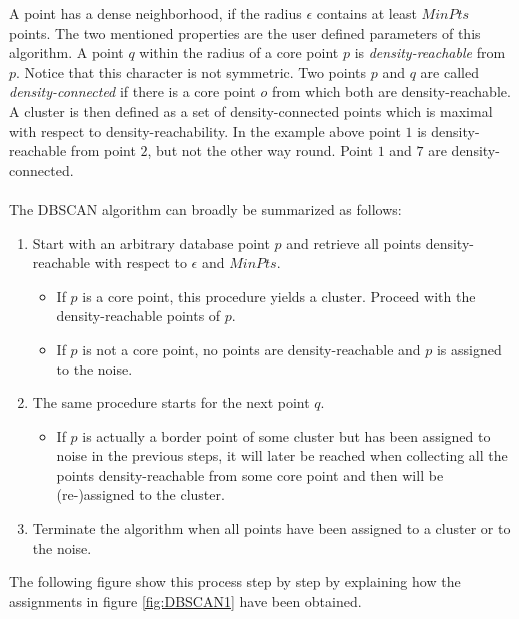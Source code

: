 \noindent A point has a dense neighborhood, if the radius $\epsilon$ contains at least $MinPts$ points. The two mentioned properties are the user defined parameters of this algorithm. A point $q$ within the radius of a core point $p$ is \textit{density-reachable} from $p$. Notice that this character is not symmetric. Two points $p$ and $q$ are called \textit{density-connected} if there is a core point $o$ from which both are density-reachable. A cluster is then defined as a set of density-connected points which is maximal with respect to density-reachability. In the example above point $1$ is density-reachable from point $2$, but not the other way round. Point $1$ and $7$ are density-connected.\\
\\
The DBSCAN algorithm can broadly be summarized as follows:
\begin{enumerate}
\item Start with an arbitrary database point $p$ and retrieve all points density-reachable with respect to $\epsilon$ and $MinPts$.
\begin{itemize}
\item If $p$ is a core point, this procedure yields a cluster. Proceed with the density-reachable points of $p$. 
\item If $p$ is not a core point, no points are density-reachable and $p$ is assigned to the noise.
\end{itemize}
\item The same procedure starts for the next point $q$.
\begin{itemize}
\item If $p$ is actually a border point of some cluster but has been assigned to noise in the previous steps, it will later be reached when collecting all the points density-reachable from some core point and then will be (re-)assigned to the cluster.
\end{itemize}
\item Terminate the algorithm when all points have been assigned to a cluster or to the noise.
\end{enumerate}
The following figure show this process step by step by explaining how the assignments in figure \ref{fig:DBSCAN1} have been obtained.

